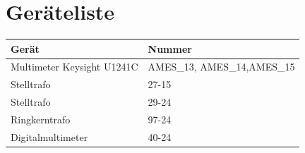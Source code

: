 \documentclass[
12pt,
a4paper,
headings=small,                    %
bibliography=totoc,                %
listof=totoc,                      %
parskip=half*,                     %
]{scrartcl}                        %
\begin{document}
\printbibliography


\section*{Geräteliste}
\begin{table} [H]
    \begin{tabular}{|l|l|}
        \hline
        \textbf{Gerät }            & \textbf{Nummer }            \\ \hline
        Multimeter Keysight U1241C & AMES\_13, AMES\_14,AMES\_15 \\ \hline
        Stelltrafo                 & 27-15                       \\ \hline
        Stelltrafo                 & 29-24                       \\ \hline
        Ringkerntrafo              & 97-24                       \\ \hline
        Digitalmultimeter          & 40-24                       \\ \hline
    \end{tabular}
\end{table}
\end{document}
